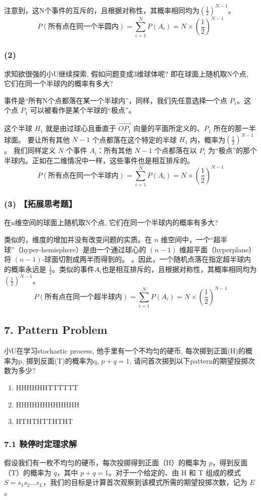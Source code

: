 \documentclass[UTF8]{ctexart}
\begin{document}
注意到，这N个事件的互斥的，且根据对称性，其概率相同均为$(\frac{1}{2})^{N-1}$。
$$ P(\text{所有点在同一个半圆内}) = \sum_{i=1}^{N} P(A_i) = N \times \left(\frac{1}{2}\right)^{N-1} $$
\subsubsection*{(2)}
求知欲很强的小U继续探索, 假如问题变成3维球体呢? 即在球面上随机取N个点, 它们在同一个半球内的概率有多大?

事件是“所有N个点都落在某一个半球内”，同样，我们先任意选择一个点 $P_1$。这个点 $P_1$ 可以被看作是某个半球的“极点”。

这个半球 $H_1$ 就是由过球心且垂直于 $\vec{OP_1}$ 向量的平面所定义的、$P_1$ 所在的那一半球面。
要让所有其他 $N-1$ 个点都落在这个特定的半球 $H_1$ 内，概率为$(\frac{1}{2})^{N-1}$。
我们同样定义 $N$ 个事件 $A_i$：所有其他 $N-1$ 个点都落在以 $P_i$ 为“极点”的那个半球内。正如在二维情况中一样，这些事件也是相互排斥的。
$$ P(\text{所有点在同一个半球内}) = \sum_{i=1}^{N} P(A_i) = N \times \left(\frac{1}{2}\right)^{N-1} $$
\subsubsection*{(3) 【拓展思考题】}
在n维空间的球面上随机取N个点, 它们在同一个半球内的概率有多大?

类似的，维度的增加并没有改变问题的实质。在 $n$ 维空间中，一个“超半球”（hyper-hemisphere）是由一个通过球心的 $(n-1)$ 维超平面（hyperplane）将 $(n-1)$-球面切割成两半而得到的。
。因此，一个随机点落在指定超半球内的概率永远是 $\frac{1}{2}$。类似的事件$A_i$也是相互排斥的，且根据对称性，其概率相同均为$(\frac{1}{2})^{N-1}$。
$$ P(\text{所有点在同一个超半球内}) = \sum_{i=1}^{N} P(A_i) = N \times \left(\frac{1}{2}\right)^{N-1} $$
\subsection*{7. Pattern Problem}
小U在学习stochastic process, 他手里有一个不均匀的硬币, 每次掷到正面(H)的概率为p, 掷到反面(T)的概率为q, $p+q=1$, 请问首次掷到以下pattern的期望投掷次数为多少?
\begin{enumerate}
    \item HHHHHHTTTTTT
    \item HHHHHHHHHHHH
    \item HTHTHTTHTHT
\end{enumerate}

\subsubsection*{7.1 鞅停时定理求解}
假设我们有一枚不均匀的硬币，每次投掷得到正面（H）的概率为 $p$，得到反面（T）的概率为 $q$，其中 $p+q=1$。对于一个给定的、由 H 和 T 组成的模式 $S = s_1s_2...s_L$，我们的目标是计算首次观察到该模式所需的期望投掷次数，记为 $E$。
\end{document}
